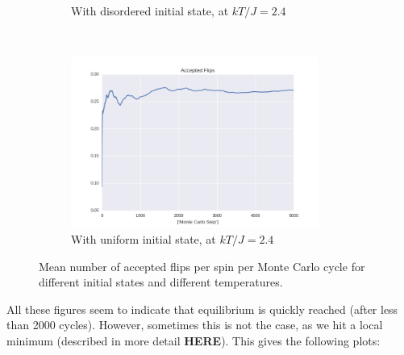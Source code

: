 \documentclass[a4paper, 10pt]{article}
\begin{document}
\begin{figure}[!ht]
\begin{subfigure}[H!]{0.5\textwidth}
        \caption{With disordered initial state, at $kT/J=2.4$}
    \end{subfigure}%
    ~ 
    \begin{subfigure}[H!]{0.5\textwidth}
        \centering
        \includegraphics[height=2.2in]{flipsWUpStartT24.png}
        \caption{With uniform initial state, at $kT/J=2.4$}
    \end{subfigure}
      \caption{Mean number of accepted flips per spin per Monte Carlo cycle for different initial states and different temperatures.}\label{fig:20x20_Sweep_flips}
\end{figure}
All these figures seem to indicate that equilibrium is quickly reached (after less than 2000 cycles). However, sometimes this is not the case, as we hit a local minimum (described in more detail \textbf{HERE}). This gives the following plots:
\end{document}
